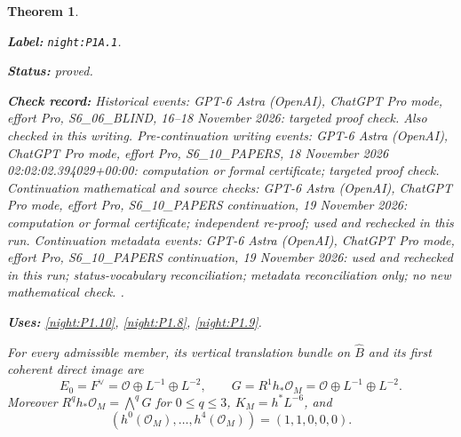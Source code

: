\documentclass[11pt,a4paper]{article}
\newtheorem{theorem}{Theorem}[section]
\theoremstyle{definition}
\newcommand{\StatementRecord}[4]{\par\smallskip\begingroup\upshape\raggedright\noindent\textbf{Label:} \nolinkurl{#1}.\par\noindent\textbf{Status:} #2.\par\noindent\textbf{Check record:} #3.\par\noindent\textbf{Uses:} #4.\par\endgroup\smallskip}
\begin{document}
\begin{theorem}\label{night:P1A.1}
\StatementRecord{night:P1A.1}{proved}{Historical events: GPT-6 Astra (OpenAI), ChatGPT Pro mode, effort Pro, S6\_06\_BLIND, 16--18 November 2026: targeted proof check. Also checked in this writing. Pre-continuation writing events: GPT-6 Astra (OpenAI), ChatGPT Pro mode, effort Pro, S6\_10\_PAPERS, 18 November 2026 02:02:02.394029+00:00: computation or formal certificate; targeted proof check. Continuation mathematical and source checks: GPT-6 Astra (OpenAI), ChatGPT Pro mode, effort Pro, S6\_10\_PAPERS continuation, 19 November 2026: computation or formal certificate; independent re-proof; used and rechecked in this run. Continuation metadata events: GPT-6 Astra (OpenAI), ChatGPT Pro mode, effort Pro, S6\_10\_PAPERS continuation, 19 November 2026: used and rechecked in this run; status-vocabulary reconciliation; metadata reconciliation only; no new mathematical check. }{\cref{night:P1.10}, \cref{night:P1.8}, \cref{night:P1.9}}
For every admissible member, its vertical translation bundle on
$\widehat B$ and its first coherent direct image are
\[
 E_0=F^\vee=\mathcal O\oplus L^{-1}\oplus L^{-2},\qquad
 G=R^1h_*\mathcal O_M=\mathcal O\oplus L^{-1}\oplus L^{-2}.
\]
Moreover $R^qh_*\mathcal O_M=\bigwedge^qG$ for $0\le q\le3$,
$K_M=h^*L^{-6}$, and
\[
 (h^0(\mathcal O_M),\ldots,h^4(\mathcal O_M))=(1,1,0,0,0).
\]
\end{theorem}
\end{document}
